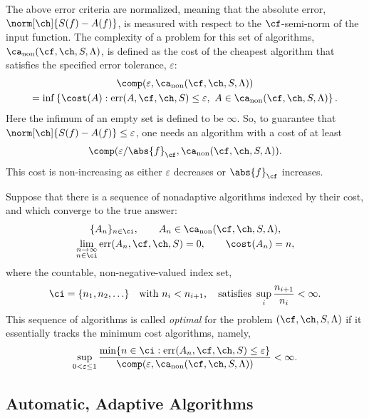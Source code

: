 \documentclass[]{elsarticle}
\DeclareMathOperator{\fix}{non}
\DeclareMathOperator{\err}{err}
\theoremstyle{definition}
\theoremstyle{remark}
\newcommand{\Fnorm}[1]{\abs{#1}_{\cf}}
\begin{document}
The above error criteria are normalized, meaning that the absolute error, $\norm[\ch]{S(f) -  A(f)}$, is measured with respect to the $\cf$-semi-norm of the input function. The complexity of a problem for this set of algorithms, $\ca_{\fix}(\cf,\ch,S,\Lambda)$, is defined as the cost of the cheapest algorithm that satisfies the specified error tolerance, $\varepsilon$:
\begin{multline} \label{fixcostcomplex}
\comp(\varepsilon,\ca_{\fix}(\cf,\ch,S,\Lambda)) \\
= \inf\left\{\cost(A) : \err(A,\cf,\ch,S) \le \varepsilon, \ A \in \ca_{\fix}(\cf,\ch,S,\Lambda) \right \}.
\end{multline}
Here the infimum of an empty set is defined to be $\infty$.  So, to guarantee that $\norm[\ch]{S(f) -  A(f)} \le \varepsilon$, one needs an algorithm with a cost of at least 
\[
\comp(\varepsilon/\Fnorm{f},\ca_{\fix}(\cf,\ch,S,\Lambda)).
\]
This cost is non-increasing as either $\varepsilon$ decreases or $\Fnorm{f}$ increases.

Suppose that there is a sequence of nonadaptive algorithms indexed by their cost, and which converge to the true answer:
\begin{subequations} \label{algseqdef}
\begin{gather} 
\{A_n\}_{n \in \ci}, \qquad A_n  \in \ca_{\fix}(\cf,\ch,S,\Lambda), \\
\lim_{\substack{n \to \infty\\ n \in \ci}} \err(A_n,\cf,\ch,S) = 0, \qquad \cost(A_n) = n,  
\end{gather}
\end{subequations}
where the countable, non-negative-valued index set, 
\begin{equation} \label{indexdef}
\ci=\{n_1, n_2, \ldots\} \quad \text{with } n_i < n_{i+1}, \quad \text{satisfies } \sup_i \frac{n_{i+1}}{n_i} <\infty. 
\end{equation} 
This sequence of algorithms is called \emph{optimal} for the problem $(\cf,\ch,S,\Lambda)$ if it essentially tracks the minimum cost algorithms, namely,
\begin{equation} \label{nearoptdef}
\sup_{0 < \varepsilon \le 1} \frac{\min\{n \in \ci : \err(A_n,\cf,\ch,S) \le \varepsilon\}} {\comp(\varepsilon,\ca_{\fix}(\cf,\ch,S,\Lambda))} <\infty.
\end{equation}

\subsection{Automatic, Adaptive Algorithms} \label{AutoAlgsec}
\end{document}
